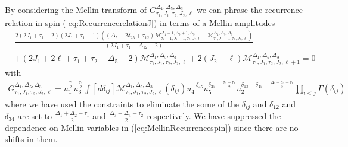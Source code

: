  By considering the Mellin transform of $G_{\tau_1,J_1,\tau_2,J_2,\ell}^{\Delta_1,\Delta_5,\Delta_3}$ we can phrase the recurrence relation in spin (\ref{eq:RecurrencerelationJ})  in terms of a Mellin amplitudes
\begin{align}
   & \frac{2 (2 J_1+\tau_1-2) (2 J_1+\tau_1-1) ((\Delta_5-2 \delta_{25}+\tau_{12}) \mathcal{M}_{\tau_1+1,J_1-1,\tau_2,J_2,l}^{\Delta_1+1,\Delta_5+1,\Delta_3}-\mathcal{M}_{\tau_1,J_1-1,\tau_2,J_2,\ell}^{\Delta_1,\Delta_5,\Delta_3})}{(2 J_1+\tau_1-\Delta_{12}-2) } \nonumber \\
   & +(2 J_1+2 \ell+\tau_1+\tau_2-\Delta_5-2)\mathcal{M}_{\tau_1,J_1,\tau_2,J_2,\ell}^{\Delta_1,\Delta_5,\Delta_3}+2 (J_2-\ell) \mathcal{M}_{\tau_1,J_1,\tau_2,J_2,\ell+1}^{\Delta_1,\Delta_5,\Delta_3}=0\label{eq:MellinRecurrencespin}
\end{align}
with
\begin{align}
  G_{\tau_1,J_1,\tau_2,J_2,\ell}^{\Delta_1,\Delta_5,\Delta_3} = u_1^{\frac{\tau_1}{2}}  u_3^{\frac{\tau_2}{2}}\! \int [d\delta_{ij}] \mathcal{M}_{\tau_1,J_1,\tau_2,J_2,\ell}^{\Delta_1,\Delta_5,\Delta_3}(\delta_{ij})  u_4^{-\delta_{45}} u_5^{\delta_{ 25}+\frac{ \tau_2-\tau_1 }{2}} u_2^{\delta_{13} -\delta_{45} +\frac{\Delta_5-a_2-\tau_1}{2}} \prod_{i<j}\Gamma(\delta_{ij})
\end{align}
where we have used the constraints to eliminate the some of the $\delta_{ij}$ and $\delta_{12}$ and $\delta_{34}$ are set to $\frac{\Delta_1+\Delta_2-\tau_1}{2}$ and $\frac{\Delta_3+\Delta_4-\tau_2}{2}$ respectively. We have suppressed the dependence on Mellin variables in (\ref{eq:MellinRecurrencespin}) since there are no shifts in them.


